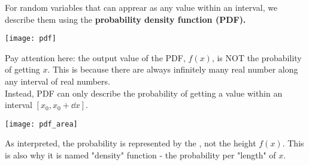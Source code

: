\documentclass[class=article, crop=false, 12pt]{standalone}
\begin{document}
For random variables that can apprear as any value within an interval,
we describe them using the \bf{probability density function} (PDF).

\begin{center}
    \begin{minipage}{0.5\linewidth}
        \centering
        \texttt{[image: pdf]}
    \end{minipage}
\end{center}


Pay attention here: the output value of the PDF, $f(x)$, 
is NOT the probability of getting $x$. 
This is because there are always infinitely many real number along any interval of real numbers.
\\

Instead, PDF can only describe the probability of getting a value within an interval $[x_0,x_0+\dd{x}]$.


\begin{center}
    \begin{minipage}{0.6\linewidth}
        \centering
        \texttt{[image: pdf\_area]}
    \end{minipage}
\end{center}

As interpreted, the probability is represented by the ,
not the height $f(x)$. This is also why it is named "density" function - 
the probability per "length" of $x$.
\end{document}

